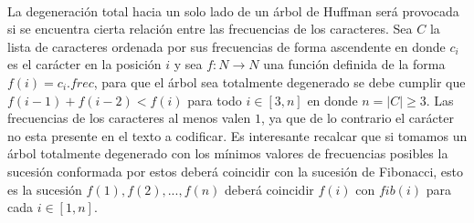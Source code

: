 ~

La degeneraci\'on total hacia un solo lado de un \'arbol de Huffman ser\'a provocada si se encuentra cierta relaci\'on entre las frecuencias de los caracteres. Sea $C$ la lista de caracteres ordenada por sus frecuencias de forma ascendente en donde $c_i$ es el car\'acter en la posici\'on $i$ y sea $f: N \rightarrow N$ una funci\'on definida de la forma $f(i) = c_i.frec$, para que el \'arbol sea totalmente degenerado se debe cumplir que $f(i-1) + f(i-2) < f(i)$ para todo $i \in [3, n]$ en donde $n=|C| \geq 3$. Las frecuencias de los caracteres al menos valen $1$, ya que de lo contrario el car\'acter no esta presente en el texto a codificar. Es interesante recalcar que si tomamos un \'arbol totalmente degenerado con los m\'inimos valores de frecuencias posibles la sucesi\'on conformada por estos deber\'a coincidir con la sucesi\'on de Fibonacci, esto es la sucesi\'on $f(1), f(2), ..., f(n)$ deber\'a coincidir $f(i)$ con $fib(i)$ para cada $i \in [1,n]$.


%
%

%
%
%
%
%


